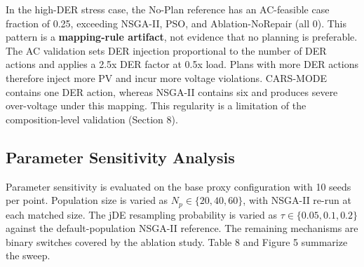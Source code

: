 \documentclass[energies,article,submit,moreauthors]{Definitions/mdpi}
\begin{document}
In the high-DER stress case, the No-Plan reference has an AC-feasible case fraction of 0.25, exceeding NSGA-II, PSO, and Ablation-NoRepair (all 0). This pattern is a \textbf{mapping-rule artifact}, not evidence that no planning is preferable. The AC validation sets DER injection proportional to the number of DER actions and applies a 2.5x DER factor at 0.5x load. Plans with more DER actions therefore inject more PV and incur more voltage violations. CARS-MODE contains one DER action, whereas NSGA-II contains six and produces severe over-voltage under this mapping. This regularity is a limitation of the composition-level validation (Section 8).

\subsection{Parameter Sensitivity Analysis}\label{parameter-sensitivity-analysis}

Parameter sensitivity is evaluated on the base proxy configuration with 10 seeds per point. Population size is varied as \(N_p\in\{20,40,60\}\), with NSGA-II re-run at each matched size. The jDE resampling probability is varied as \(\tau\in\{0.05,0.1,0.2\}\) against the default-population NSGA-II reference. The remaining mechanisms are binary switches covered by the ablation study. Table 8 and Figure 5 summarize the sweep.
\end{document}
